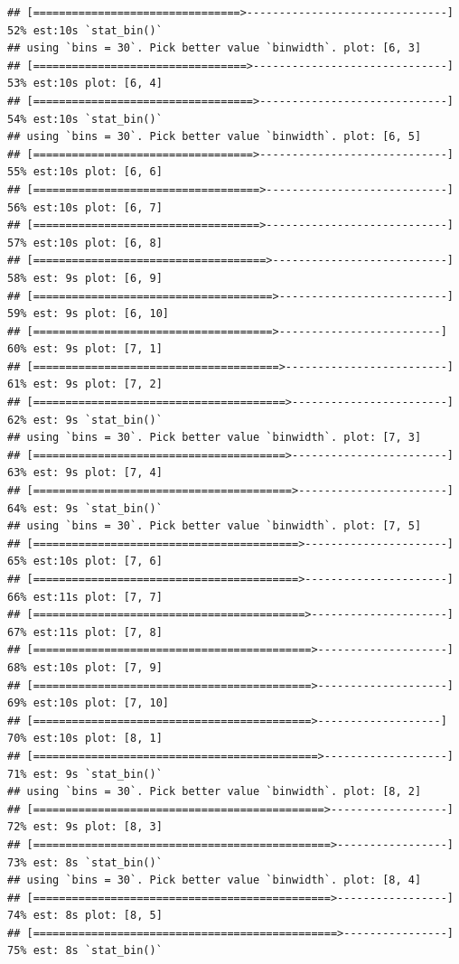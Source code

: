\documentclass[
]{article}
\begin{document}
\begin{verbatim}
## [================================>-------------------------------] 52% est:10s `stat_bin()`
## using `bins = 30`. Pick better value `binwidth`. plot: [6, 3]
## [=================================>------------------------------] 53% est:10s plot: [6, 4]
## [==================================>-----------------------------] 54% est:10s `stat_bin()`
## using `bins = 30`. Pick better value `binwidth`. plot: [6, 5]
## [==================================>-----------------------------] 55% est:10s plot: [6, 6]
## [===================================>----------------------------] 56% est:10s plot: [6, 7]
## [===================================>----------------------------] 57% est:10s plot: [6, 8]
## [====================================>---------------------------] 58% est: 9s plot: [6, 9]
## [=====================================>--------------------------] 59% est: 9s plot: [6, 10]
## [=====================================>-------------------------] 60% est: 9s plot: [7, 1]
## [======================================>-------------------------] 61% est: 9s plot: [7, 2]
## [=======================================>------------------------] 62% est: 9s `stat_bin()`
## using `bins = 30`. Pick better value `binwidth`. plot: [7, 3]
## [=======================================>------------------------] 63% est: 9s plot: [7, 4]
## [========================================>-----------------------] 64% est: 9s `stat_bin()`
## using `bins = 30`. Pick better value `binwidth`. plot: [7, 5]
## [=========================================>----------------------] 65% est:10s plot: [7, 6]
## [=========================================>----------------------] 66% est:11s plot: [7, 7]
## [==========================================>---------------------] 67% est:11s plot: [7, 8]
## [===========================================>--------------------] 68% est:10s plot: [7, 9]
## [===========================================>--------------------] 69% est:10s plot: [7, 10]
## [===========================================>-------------------] 70% est:10s plot: [8, 1]
## [============================================>-------------------] 71% est: 9s `stat_bin()`
## using `bins = 30`. Pick better value `binwidth`. plot: [8, 2]
## [=============================================>------------------] 72% est: 9s plot: [8, 3]
## [==============================================>-----------------] 73% est: 8s `stat_bin()`
## using `bins = 30`. Pick better value `binwidth`. plot: [8, 4]
## [==============================================>-----------------] 74% est: 8s plot: [8, 5]
## [===============================================>----------------] 75% est: 8s `stat_bin()`

\end{verbatim}
\end{document}

